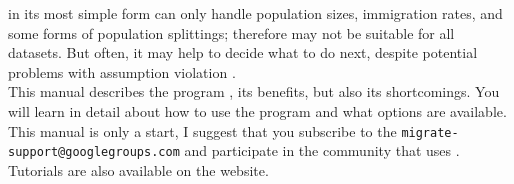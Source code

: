 \migrate in its most simple form can only handle population sizes, immigration rates, and some forms of population splittings; therefore may not be suitable for all datasets. But often, it may help to decide what to do next, despite potential problems with assumption violation \citep{beerli:2009:wid}. \\
This manual describes the program \migrate, its benefits, but also its shortcomings. You will learn in detail about how to use the program and what options are available. This manual is only a start, I suggest that you subscribe to the {\tt migrate-support@googlegroups.com} and participate in the community that uses \migrate. Tutorials are also available on the \migrate website.